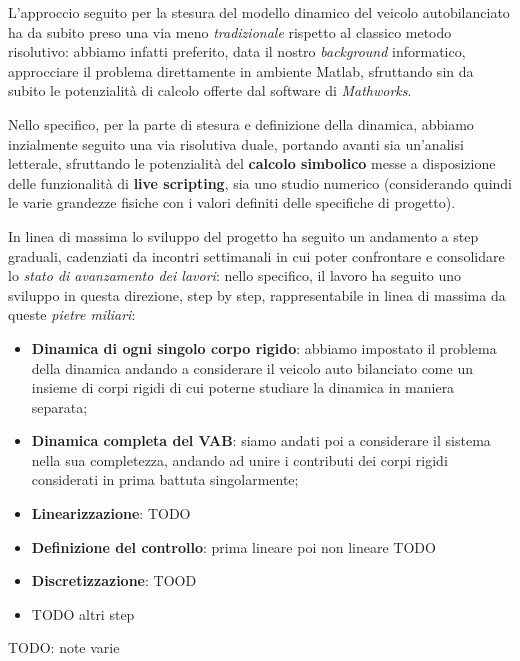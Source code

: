 L'approccio seguito per la stesura del modello dinamico del veicolo autobilanciato ha da subito preso una via meno \textit{tradizionale} rispetto al classico metodo risolutivo: abbiamo infatti preferito, data il nostro \textit{background} informatico, approcciare il problema direttamente in ambiente Matlab, sfruttando sin da subito le potenzialità di calcolo offerte dal software di \textit{Mathworks}.

Nello specifico, per la parte di stesura e definizione della dinamica, abbiamo inzialmente seguito una via risolutiva duale, portando avanti sia un'analisi letterale, sfruttando le potenzialità del \textbf{calcolo simbolico} messe a disposizione delle funzionalità di \textbf{live scripting}, sia uno studio numerico (considerando quindi le varie grandezze fisiche con i valori definiti delle specifiche di progetto).

In linea di massima lo sviluppo del progetto ha seguito un andamento a step graduali, cadenziati da incontri settimanali in cui poter confrontare e consolidare lo \textit{stato di avanzamento dei lavori}: nello specifico, il lavoro ha seguito uno sviluppo in questa direzione, step by step, rappresentabile in linea di massima da queste \textit{pietre miliari}:
\begin{itemize}
	\item \textbf{Dinamica di ogni singolo corpo rigido}: abbiamo impostato il problema della dinamica andando a considerare il veicolo auto bilanciato come un insieme di corpi rigidi di cui poterne studiare la dinamica in maniera separata;
	\item \textbf{Dinamica completa del VAB}: siamo andati poi a considerare il sistema nella sua completezza, andando ad unire i contributi dei corpi rigidi considerati in prima battuta singolarmente;
	\item \textbf{Linearizzazione}: TODO
	\item \textbf{Definizione del controllo}: prima lineare poi non lineare TODO
	\item \textbf{Discretizzazione}: TOOD
	\item TODO altri step
\end{itemize}

TODO: note varie